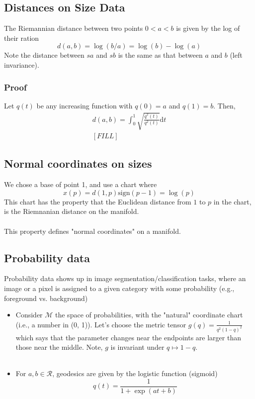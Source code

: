 \documentclass[10pt]{article}
\newcommand{\dd}{\text{d}}
\begin{document}
\subsection*{Distances on Size Data}
The Riemannian distance between two points $0 < a < b$ is given by the log of their ration
\[d(a, b) = \log(b/a) = \log(b) - \log(a)\]
Note the distance between $sa$ and $sb$ is the same as that between $a$ and $b$ (left invariance).

\subsubsection*{Proof}
Let $q(t)$ be any increasing function with $q(0) = a$ and $q(1) = b$.  Then,
\begin{align*}
    d(a, b) = \int_0^1 \sqrt{\frac{\dot{q}^2(t)}{q^2(t)}} \dd t\\
    [FILL]
\end{align*}

\subsection*{Normal coordinates on sizes}
We chose a base of point 1, and use a chart where
\[x(p) = d(1, p) \text{sign}(p - 1) = \log(p)\]
This chart has the property that the Euclidean distance from $1$ to $p$ in the chart, is the Riemnanian distance on the manifold.\\\\
This property defines "normal coordinates" on a manifold.

\subsection*{Probability data}
Probability data shows up in image segmentation/classification tasks, where an image or a pixel is assigned to a given category with some probability (e.g., foreground vs. background)
\begin{itemize}
	\item Consider $\mathcal{M}$ the space of probabilities, with the "natural" coordinate chart (i.e., a number in (0, 1)).  Let's choose the metric tensor $g(q) = \frac{1}{q^2 (1-q)^2}$ which says that the parameter changes near the endpoints are larger than those near the middle.  Note, $g$ is invariant under $q \mapsto 1 - q$.\\\\
	\item For $a, b \in \mathcal{R}$, geodesics are given by the logistic function (sigmoid)
	\[q(t) = \frac{1}{1 + \exp(at + b)}\]
\end{itemize}
\end{document}
